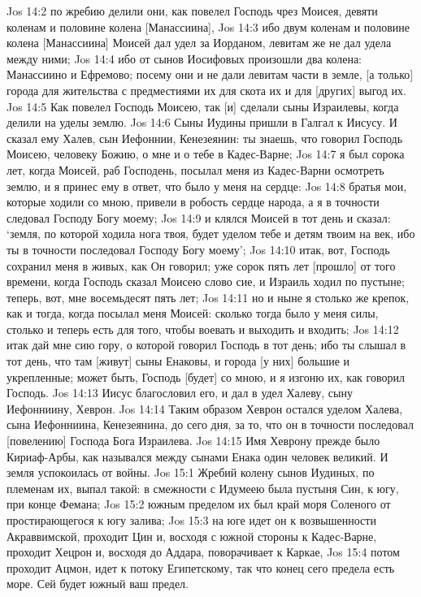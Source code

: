 Jos 14:2  по жребию делили они, как повелел Господь чрез Моисея, девяти коленам и половине колена [Манассиина],
Jos 14:3  ибо двум коленам и половине колена [Манассиина] Моисей дал удел за Иорданом, левитам же не дал удела между ними;
Jos 14:4  ибо от сынов Иосифовых произошли два колена: Манассиино и Ефремово; посему они и не дали левитам части в земле, [а только] города для жительства с предместиями их для скота их и для [других] выгод их.
Jos 14:5  Как повелел Господь Моисею, так [и] сделали сыны Израилевы, когда делили на уделы землю.
Jos 14:6  Сыны Иудины пришли в Галгал к Иисусу. И сказал ему Халев, сын Иефоннии, Кенезеянин: ты знаешь, что говорил Господь Моисею, человеку Божию, о мне и о тебе в Кадес-Варне;
Jos 14:7  я был сорока лет, когда Моисей, раб Господень, посылал меня из Кадес-Варни осмотреть землю, и я принес ему в ответ, что было у меня на сердце:
Jos 14:8  братья мои, которые ходили со мною, привели в робость сердце народа, а я в точности следовал Господу Богу моему;
Jos 14:9  и клялся Моисей в тот день и сказал: `земля, по которой ходила нога твоя, будет уделом тебе и детям твоим на век, ибо ты в точности последовал Господу Богу моему';
Jos 14:10  итак, вот, Господь сохранил меня в живых, как Он говорил; уже сорок пять лет [прошло] от того времени, когда Господь сказал Моисею слово сие, и Израиль ходил по пустыне; теперь, вот, мне восемьдесят пять лет;
Jos 14:11  но и ныне я столько же крепок, как и тогда, когда посылал меня Моисей: сколько тогда было у меня силы, столько и теперь есть для того, чтобы воевать и выходить и входить;
Jos 14:12  итак дай мне сию гору, о которой говорил Господь в тот день; ибо ты слышал в тот день, что там [живут] сыны Енаковы, и города [у них] большие и укрепленные; может быть, Господь [будет] со мною, и я изгоню их, как говорил Господь.
Jos 14:13  Иисус благословил его, и дал в удел Халеву, сыну Иефонниину, Хеврон.
Jos 14:14  Таким образом Хеврон остался уделом Халева, сына Иефонниина, Кенезеянина, до сего дня, за то, что он в точности последовал [повелению] Господа Бога Израилева.
Jos 14:15  Имя Хеврону прежде было Кириаф-Арбы, как назывался между сынами Енака один человек великий. И земля успокоилась от войны.
Jos 15:1  Жребий колену сынов Иудиных, по племенам их, выпал такой: в смежности с Идумеею была пустыня Син, к югу, при конце Фемана;
Jos 15:2  южным пределом их был край моря Соленого от простирающегося к югу залива;
Jos 15:3  на юге идет он к возвышенности Акраввимской, проходит Цин и, восходя с южной стороны к Кадес-Варне, проходит Хецрон и, восходя до Аддара, поворачивает к Каркае,
Jos 15:4  потом проходит Ацмон, идет к потоку Египетскому, так что конец сего предела есть море. Сей будет южный ваш предел.
